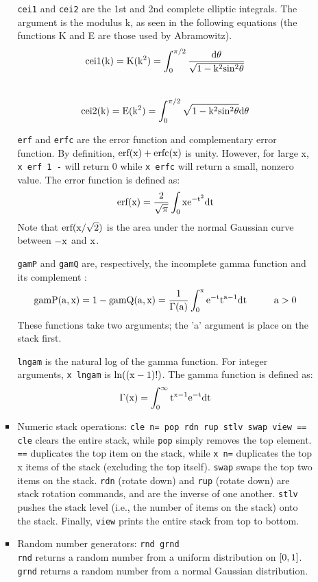 \begin{itemize}
\begin{itemize}
\begin{itemize}
{\tt cei1} and {\tt cei2} are the 1st and 2nd complete elliptic integrals.  The argument is the modulus k, as seen in
the following equations (the functions K and E are those used by Abramowitz\cite{Abramowitz}).
\[{\rm cei1(k) = K(k^2) = \int_0^{\pi/2} \frac{d\theta}{\sqrt{1 - k^2 sin^2 \theta}}  } \] \\
\[{\rm cei2(k) = E(k^2) = \int_0^{\pi/2} \sqrt{1 - k^2 sin^2 \theta} d\theta }\]

{\tt erf} and {\tt erfc} are the error function and complementary error function.  By definition, ${\rm erf(x) + erfc(x)}$
is unity.  However, for large x, {\tt x erf 1 -} will return 0 while {\tt x erfc} will return a small, nonzero value.
The error function is defined as\cite{Abramowitz}:
\[ {\rm erf(x) = \frac{2}{\sqrt{\pi}} \int_0 x e^{-t^2} dt} \]
Note that ${\rm erf(x/\sqrt{2}) }$ is the area under the normal Gaussian curve between ${\rm -x}$ and ${\rm x}$.

{\tt gamP} and {\tt gamQ} are, respectively, the incomplete gamma function and its complement
\cite{Abramowitz}:
\[{\rm gamP(a, x) = 1-gamQ(a, x) = \frac{1}{\Gamma(a)} \int_0^x e^{-t} t^{a-1} dt \hspace*{10mm}  a>0} \]
These functions take two arguments; the 'a' argument is place on the stack first.

{\tt lngam} is the natural log of the gamma function.  For integer arguments, {\tt x lngam} is 
${\rm ln( (x-1)!) }$.  The gamma function is defined as\cite{Abramowitz}:
\[ {\rm \Gamma (x) = \int_0^\infty t^{x-1} e^{-t} dt } \]

\item Numeric stack operations: {\tt cle n= pop rdn rup stlv swap view ==}\\
{\tt cle} clears the entire stack, while {\tt pop} simply removes the top element.  {\tt ==} duplicates the top item on
the stack, while {\tt x n=} duplicates the top x items of the stack (excluding the top itself).  {\tt swap} swaps the top
two items on the stack. {\tt rdn} (rotate down) and {\tt rup} (rotate down) are stack rotation commands, and are the
inverse of one another.  {\tt stlv} pushes the stack level (i.e., the number of items on the stack) onto the stack.
Finally, {\tt view} prints the entire stack from top to bottom.

\item Random number generators: {\tt rnd grnd}\\
{\tt rnd} returns a random number from a uniform distribution on ${\rm [0, 1]}$.  {\tt grnd} returns
a random number from a normal Gaussian distribution.


\end{itemize}
\end{itemize}
\end{itemize}
